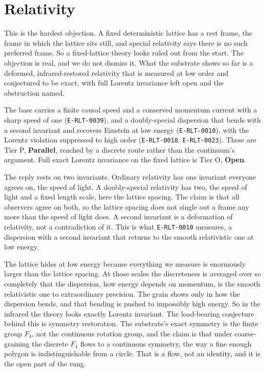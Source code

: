 \section{Relativity}

This is the hardest objection. A fixed deterministic lattice has a rest frame, the
frame in which the lattice sits still, and special relativity says there is no
such preferred frame. So a fixed-lattice theory looks ruled out from the start. The
objection is real, and we do not dismiss it. What the substrate shows so far is a
deformed, infrared-restored relativity that is measured at low order and
conjectured to be exact, with full Lorentz invariance left open and the
obstruction named.

\begin{finding}
The base carries a finite causal speed and a conserved momentum current with a
sharp speed of one (\texttt{E-RLT-0039}), and a doubly-special dispersion that bends with a
second invariant and recovers Einstein at low energy (\texttt{E-RLT-0010}), with the
Lorentz violation suppressed to high order (\texttt{E-RLT-0018}, \texttt{E-RLT-0023}). These are
Tier P, \textbf{Parallel}, reached by a discrete route rather than the
continuum's argument. Full exact Lorentz invariance on the fixed lattice is Tier
O, \textbf{Open}.
\end{finding}

The reply rests on two invariants. Ordinary relativity has one invariant everyone
agrees on, the speed of light. A doubly-special relativity has two, the speed of
light and a fixed length scale, here the lattice spacing. The claim is that all
observers agree on both, so the lattice spacing does not single out a frame any
more than the speed of light does. A second invariant is a deformation of
relativity, not a contradiction of it. This is what \texttt{E-RLT-0010} measures, a
dispersion with a second invariant that returns to the smooth relativistic one at
low energy.

The lattice hides at low energy because everything we measure is enormously
larger than the lattice spacing. At those scales the discreteness is averaged
over so completely that the dispersion, how energy depends on momentum, is the
smooth relativistic one to extraordinary precision. The grain shows only in how
the dispersion bends, and that bending is pushed to impossibly high energy. So in
the infrared the theory looks exactly Lorentz invariant. The load-bearing
conjecture behind this is symmetry restoration. The substrate's exact symmetry is
the finite group $F_4$, not the continuous rotation group, and the claim is that
under coarse-graining the discrete $F_4$ flows to a continuous symmetry, the way
a fine enough polygon is indistinguishable from a circle. That is a flow, not an
identity, and it is the open part of the rung.

